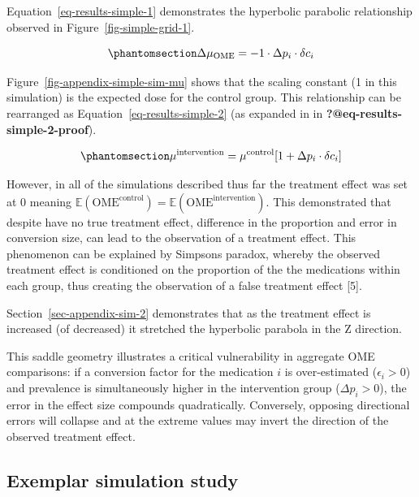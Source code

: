 \documentclass[
  letterpaper,
  DIV=11,
  numbers=noendperiod]{scrreprt}
\begin{document}
Equation~\ref{eq-results-simple-1} demonstrates the hyperbolic parabolic
relationship observed in Figure~\ref{fig-simple-grid-1}.

\begin{equation}\phantomsection\label{eq-results-simple-1}{
\Delta \mu_{\text{OME}} = -1 \cdot \Delta p_i \cdot \delta c_i
}\end{equation}

Figure~\ref{fig-appendix-simple-sim-mu} shows that the scaling constant
(1 in this simulation) is the expected dose for the control group. This
relationship can be rearranged as Equation~\ref{eq-results-simple-2} (as
expanded in in \textbf{?@eq-results-simple-2-proof}).

\begin{equation}\phantomsection\label{eq-results-simple-2}{
\mu^\text{intervention} = \mu^\text{control}[ 1 + \Delta p_i \cdot \delta c_i]
}\end{equation}

However, in all of the simulations described thus far the treatment
effect was set at 0 meaning
\(\mathbb{E}(\text{OME}^\text{control}) = \mathbb{E}(\text{OME}^\text{intervention})\).
This demonstrated that despite have no true treatment effect, difference
in the proportion and error in conversion size, can lead to the
observation of a treatment effect. This phenomenon can be explained by
Simpsons paradox, whereby the observed treatment effect is conditioned
on the proportion of the the medications within each group, thus
creating the observation of a false treatment effect {[}5{]}.

Section~\ref{sec-appendix-sim-2} demonstrates that as the treatment
effect is increased (of decreased) it stretched the hyperbolic parabola
in the Z direction.

This saddle geometry illustrates a critical vulnerability in aggregate
OME comparisons: if a conversion factor for the medication \(i\) is
over-estimated (\(\epsilon_i > 0\)) and prevalence is simultaneously
higher in the intervention group (\(\Delta p_i > 0\)), the error in the
effect size compounds quadratically. Conversely, opposing directional
errors will collapse and at the extreme values may invert the direction
of the observed treatment effect.

\subsection{Exemplar simulation study}\label{exemplar-simulation-study}
\end{document}
